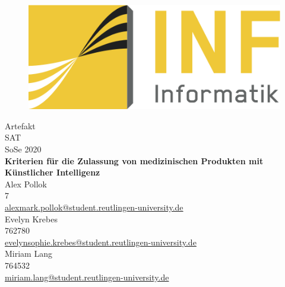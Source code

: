 \begin{titlepage}
    \begin{figure}
        \begin{flushright}
            \includegraphics[scale=0.75]{images/INFLogo.png}
        \end{flushright}
    \end{figure}

    \centering
    \vspace{1.5cm}
    {\Large Artefakt}\\

    \vspace{0.5cm}
    {\Large SAT}\\
    {\Large SoSe 2020}\\

    \vspace{1.0cm}
    \Large{\textbf{
            Kriterien für die Zulassung von medizinischen Produkten mit Künstlicher Intelligenz
          }
    }\\

    \vspace{1.0cm}
    {\small Alex Pollok}\\
    {\small 7}\\
    {\small \href{mailto:alex_mark.pollok@student.reutlingen-university.de}{alex{\textunderscore}mark.pollok@student.reutlingen-university.de}}\\
    \vspace{0,5cm}
    {\small Evelyn Krebes}\\
    {\small 762780}\\
    {\small \href{mailto:evelyn_sophie.krebes@student.reutlingen-university.de}{evelyn{\textunderscore}sophie.krebes@student.reutlingen-university.de}}\\
    \vspace{0,5cm}
    {\small Miriam Lang}\\
    {\small 764532}\\
    {\small \href{mailto:miriam.lang@student.reutlingen-university.de}{miriam.lang@student.reutlingen-university.de}}\\


\end{titlepage}

